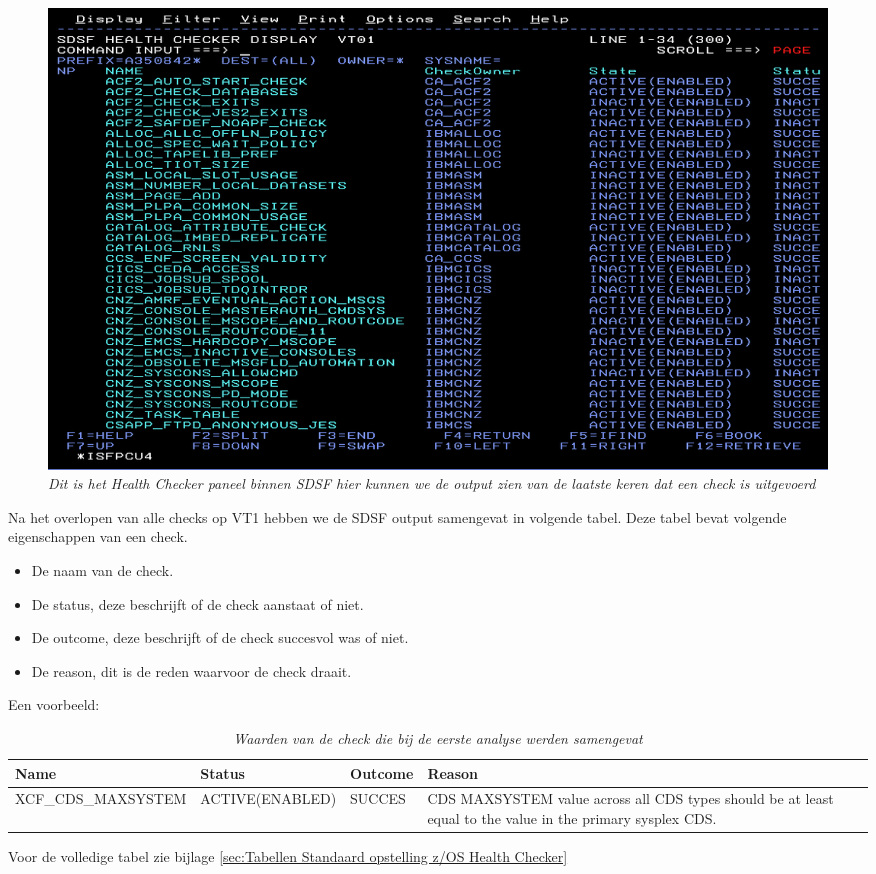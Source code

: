 \begin{figure}[h]
	\centering
	\includegraphics[width=0.7\linewidth]{img/SDSFCK}
	\caption[Health Checker Scherm binnen SDSF]{{\small \textit{Dit is het Health Checker paneel binnen SDSF hier kunnen we de output zien van de laatste keren dat een check is uitgevoerd}}}
	\label{fig:sdsfck}
\end{figure}


Na het overlopen van alle checks op VT1 hebben we de SDSF output samengevat in volgende tabel. Deze tabel bevat volgende eigenschappen van een check.

\begin{itemize}
	\item De naam van de check.
	\item De status, deze beschrijft of de check aanstaat of niet.
	\item De outcome, deze beschrijft of de check succesvol was of niet.
	\item De reason, dit is de reden waarvoor de check draait.
\end{itemize}

Een voorbeeld:

\begin{table}[]
	\begin{tabular}{|p{5cm}|p{3.5cm}|p{1.5cm}|p{5cm}|}
		\hline
		\textbf{Name} & \textbf{Status} & \textbf{Outcome} & \textbf{Reason} \\
		\hline
		XCF\_CDS\_MAXSYSTEM & ACTIVE(ENABLED) & SUCCES & CDS MAXSYSTEM value across all CDS types should be at least equal to the value 
		in the primary sysplex CDS.  \\
		\hline
	\end{tabular}
	\caption[Individuele check]{{\small \textit{Waarden van de check die bij de eerste analyse werden samengevat}}}
	\label{tbl:Individuele check}
\end{table}


Voor de volledige tabel zie bijlage \ref{sec:Tabellen Standaard opstelling z/OS Health Checker} 

